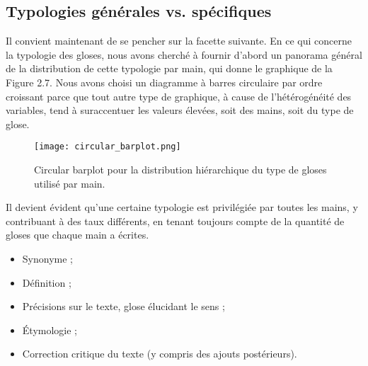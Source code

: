 \documentclass[a4paper, twoside, 12pt]{book}
\begin{document}
\subsection{Typologies générales vs. spécifiques}

Il convient maintenant de se pencher sur la facette suivante. En ce qui concerne la typologie des gloses, nous avons cherché à fournir d'abord un panorama général de la distribution de cette typologie par main, qui donne le graphique de la Figure 2.7. Nous avons choisi un diagramme à barres circulaire par ordre croissant parce que tout autre type de graphique, à cause de l'hétérogénéité des variables, tend à suraccentuer les valeurs élevées, soit des mains, soit du type de glose.


\begin{figure}[H]
    \centering
    \texttt{[image: circular\_barplot.png]}
    \caption{Circular barplot pour la distribution hiérarchique du type de gloses utilisé par main.}
\end{figure}

Il devient évident qu'une certaine typologie est privilégiée par toutes les mains, y contribuant à des taux différents, en tenant toujours compte de la quantité de gloses que chaque main a écrites. \\


\begin{itemize}
    \item  {} Synonyme ;
    \item  {} Définition ;
    \item   {} Précisions sur le texte, glose élucidant le sens ;
    \item   {} Étymologie ;
    \item   {} Correction critique du texte (y compris des ajouts postérieurs).
\end{itemize}
\end{document}
